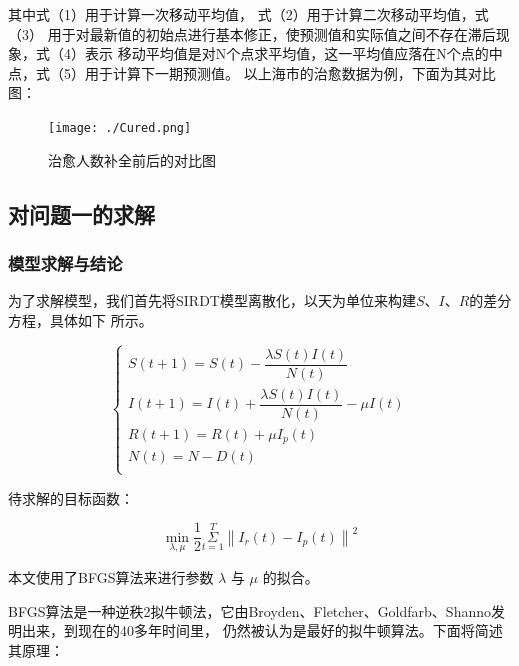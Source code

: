 \documentclass[bwprint]{gmcmthesis}
\numberwithin{figure}{section}
\begin{document}
\par 其中式（1）用于计算一次移动平均值， 式（2）用于计算二次移动平均值，式（3）
用于对最新值的初始点进行基本修正，使预测值和实际值之间不存在滞后现象，式（4）表示
移动平均值是对N个点求平均值，这一平均值应落在N个点的中点，式（5）用于计算下一期预测值。
以上海市的治愈数据为例，下面为其对比图：

\begin{figure}[!h]
    \centering
    \texttt{[image: ./Cured.png]}
    \caption{治愈人数补全前后的对比图}
    \label{fig1}
\end{figure}

\subsection{对问题一的求解}
\subsubsection{模型求解与结论}
\par 为了求解模型，我们首先将SIRDT模型离散化，以天为单位来构建$S$、$I$、$R$的差分方程，具体如下
所示。

\begin{equation} \label{}
    \begin{cases}
        S\left( t+1 \right) =S\left( t \right) -\dfrac{\lambda S\left( t \right) I\left( t \right)}{N\left( t \right)}\\
        I\left( t+1 \right) =I\left( t \right) +\dfrac{\lambda S\left( t \right) I\left( t \right)}{N\left( t \right)}-\mu I\left( t \right)\\
        R\left( t+1 \right) =R\left( t \right) +\mu I_p\left( t \right)\\
        N\left( t \right) =N-D\left( t \right)\\
    \end{cases}
\end{equation}


\par 待求解的目标函数：

\begin{equation} \label{}
    \underset{\lambda ,\mu}{\min}\frac{1}{2}\underset{t=1}{\overset{T}{\varSigma}}\left\| I_r\left( t \right) -I_p\left( t \right) \right\| ^2
\end{equation}

\par 本文使用了BFGS算法来进行参数 $\lambda$ 与 $\mu$ 的拟合。

\par BFGS算法是一种逆秩2拟牛顿法，它由Broyden、Fletcher、Goldfarb、Shanno发明出来，到现在的40多年时间里，
仍然被认为是最好的拟牛顿算法。下面将简述其原理：
\end{document}
